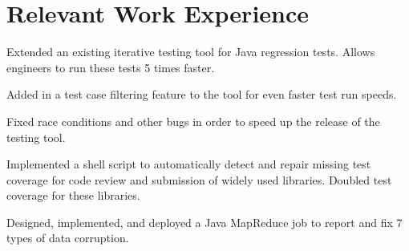 \documentclass[letterpaper]{deedy-resume} %
\begin{document}
\begin{minipage}[t]{0.66\textwidth} %


\section{Relevant Work Experience}


\vspace{\topsep} %

\begin{tightitemize}
\item Extended an existing iterative testing tool for Java regression tests. Allows engineers to run these tests 5 times faster.
\item Added in a test case filtering feature to the tool for even faster test run speeds.
\item Fixed race conditions and other bugs in order to speed up the release of the testing tool.
\end{tightitemize}

\sectionspace %




\begin{tightitemize}
\item Implemented a shell script to automatically detect and repair missing test coverage for code review and submission of widely used libraries. Doubled test coverage for these libraries.
\item Designed, implemented, and deployed a Java MapReduce job to report and fix 7 types of data corruption.
\end{tightitemize}

\sectionspace %



\end{minipage}
\end{document}
